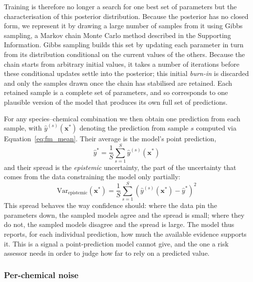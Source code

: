 Training is therefore no longer a search for one best set of parameters but the characterisation of this posterior distribution. Because the posterior has no closed form, we represent it by drawing a large number of samples from it using Gibbs sampling, a Markov chain Monte Carlo method described in the Supporting Information. Gibbs sampling builds this set by updating each parameter in turn from its distribution conditional on the current values of the others. Because the chain starts from arbitrary initial values, it takes a number of iterations before these conditional updates settle into the posterior; this initial \emph{burn-in} is discarded and only the samples drawn once the chain has stabilised are retained. Each retained sample is a complete set of parameters, and so corresponds to one plausible version of the model that produces its own full set of predictions.

For any species--chemical combination we then obtain one prediction from each sample, with $\hat{y}^{(s)}(\mathbf{x}^*)$ denoting the prediction from sample $s$ computed via Equation~\ref{eq:fm_mean}. Their average is the model's point prediction,
\begin{equation}
    \hat{y}^* = \frac{1}{S} \sum_{s=1}^{S} \hat{y}^{(s)}(\mathbf{x}^*)
    \label{eq:ppm}
\end{equation}
and their spread is the \emph{epistemic} uncertainty, the part of the uncertainty that comes from the data constraining the model only partially:
\begin{equation}
    \text{Var}_{\text{epistemic}}(\mathbf{x}^*) = \frac{1}{S} \sum_{s=1}^{S} \left( \hat{y}^{(s)}(\mathbf{x}^*) - \hat{y}^* \right)^2
    \label{eq:epistemic}
\end{equation}
This spread behaves the way confidence should: where the data pin the parameters down, the sampled models agree and the spread is small; where they do not, the sampled models disagree and the spread is large. The model thus reports, for each individual prediction, how much the available evidence supports it. This is a signal a point-prediction model cannot give, and the one a risk assessor needs in order to judge how far to rely on a predicted value.

\subsubsection{Per-chemical noise}

